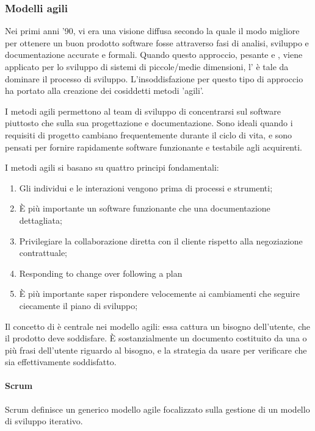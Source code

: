 
\subsubsection{Modelli agili}
Nei primi anni '90, vi era una visione diffusa secondo la quale il modo migliore per ottenere un buon prodotto software fosse attraverso fasi di analisi, sviluppo e documentazione accurate e formali. Quando questo approccio, pesante e , viene applicato per lo sviluppo di sistemi di piccole/medie dimensioni, l' è tale da dominare il processo di sviluppo. L'insoddisfazione per questo tipo di approccio ha portato alla creazione dei cosiddetti metodi 'agili'.

I metodi agili permettono al team di sviluppo di concentrarsi sul software piuttosto che sulla sua progettazione e documentazione. Sono ideali quando i requisiti di progetto cambiano frequentemente durante il ciclo di vita, e sono pensati per fornire rapidamente software funzionante e testabile agli acquirenti.

I metodi agili si basano su quattro principi fondamentali:
\begin{enumerate}
	\item Gli individui e le interazioni vengono prima di processi e strumenti;
	\item È più importante un software funzionante che una documentazione dettagliata;
	\item Privilegiare la collaborazione diretta con il cliente rispetto alla negoziazione contrattuale;
	\item Responding to change over following a plan
	\item È più importante saper rispondere velocemente ai cambiamenti che seguire ciecamente il piano di sviluppo;
\end{enumerate}

Il concetto di  è centrale nei modello agili: essa cattura un bisogno dell'utente, che il prodotto deve soddisfare. È sostanzialmente un documento costituito da una o più frasi dell'utente riguardo al bisogno, e la strategia da usare per verificare che sia effettivamente soddisfatto.

\paragraph{Scrum}
Scrum definisce un generico modello agile focalizzato sulla gestione di un modello di sviluppo iterativo.


